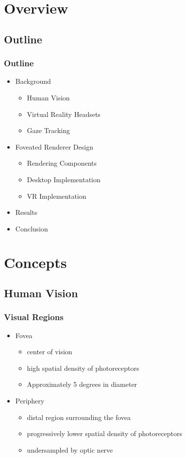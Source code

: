 \documentclass{beamer}
\newcommand{\linespace}{\vskip 0.25cm}
\begin{document}
\section*{Overview}

\subsection*{Outline}

\begin{frame}
  \frametitle{Outline}
  	
	\begin{itemize}
    \item Background
	\begin{itemize}
    \item Human Vision
    \item Virtual Reality Headsets
    \item Gaze Tracking
    \linespace
	\end{itemize}
	\item Foveated Renderer Design
	\begin{itemize}
	\item Rendering Components
    \item Desktop Implementation
    \item VR Implementation
    \linespace
	\end{itemize}
	\item Results
	\linespace
	\item Conclusion
	\end{itemize}
	

\end{frame}

\section[Background]{Concepts}

\subsection{Human Vision}

\begin{frame}
  \frametitle{Visual Regions}
	\begin{itemize}
		\item Fovea
		\begin{itemize}
			\item center of vision
			\item high spatial density of photoreceptors
			\item Approximately 5 degrees in diameter 
		\end{itemize}
	\linespace
		\item Periphery
			\begin{itemize}
				\item distal region surrounding the fovea
				\item progressively lower spatial density of photoreceptors
				\item undersampled by optic nerve
			\end{itemize}
	\end{itemize}
\end{frame}
\end{document}
